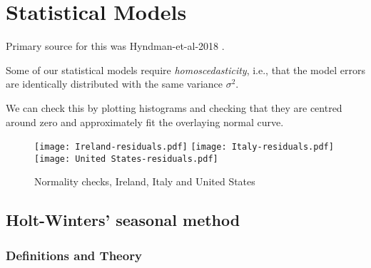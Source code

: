 \section{Statistical Models}
\label{ch:statmodel}

Primary source for this was Hyndman-et-al-2018 \cite{Hyndman-et-al-2018}.

Some of our statistical models require \textit{homoscedasticity}, i.e., that the model errors are identically distributed with the same variance $\sigma^2$.

We can check this by plotting histograms and checking that they are centred around zero and approximately fit the overlaying normal curve.

\begin{figure}[H]
  \texttt{[image: Ireland-residuals.pdf]} \label{fig:ireland-residuals}
\endminipage\hfill
{}
  \texttt{[image: Italy-residuals.pdf]} \label{fig:italy-residuals}
\endminipage\hfill
{}
  \texttt{[image: United States-residuals.pdf]} \label{fig:usa-residuals}
\endminipage\hfill
\caption{Normality checks, Ireland, Italy and United States}
\end{figure}

\subsection{Holt-Winters’ seasonal method}

\subsubsection{Definitions and Theory}

